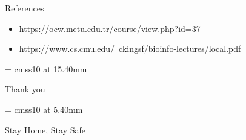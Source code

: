 \documentclass{bredelebeamer}
\begin{document}
\begin{frame}{References}   
    \begin{itemize}
        \item https://ocw.metu.edu.tr/course/view.php?id=37
        \item https://www.cs.cmu.edu/~ckingsf/bioinfo-lectures/local.pdf
    \end{itemize}

\end{frame}
\begin{frame}[plain]

      \begin{center}

        \font\endfont = cmss10 at 15.40mm
        \color{Brown}
        \endfont 
        \baselineskip 20.0mm

        Thank you

      \end{center} 
      \begin{center}

        \font\endfont = cmss10 at 5.40mm
        \color{Brown}
        \endfont 
        \baselineskip 20.0mm

        Stay Home, Stay Safe

      \end{center} 

\end{frame}
\end{document}
